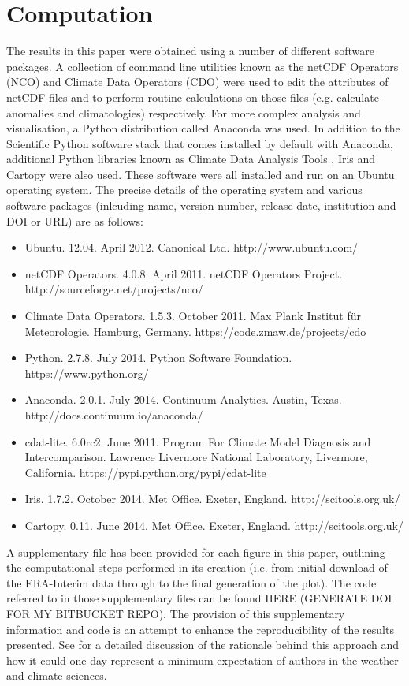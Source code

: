 \section{Computation}\label{s:computation}

The results in this paper were obtained using a number of different software packages. A collection of command line utilities known as the netCDF Operators (NCO) and Climate Data Operators (CDO) were used to edit the attributes of netCDF files and to perform routine calculations on those files (e.g. calculate anomalies and climatologies) respectively. For more complex analysis and visualisation, a Python distribution called Anaconda was used. In addition to the Scientific Python \citep[SciPy;][]{SciPy} software stack that comes installed by default with Anaconda, additional Python libraries known as Climate Data Analysis Tools \citep[CDAT;][]{Doutriaux2009}, Iris and Cartopy were also used. These software were all installed and run on an Ubuntu operating system. The precise details of the operating system and various software packages (inlcuding name, version number, release date, institution and DOI or URL) are as follows:
\begin{itemize}
\item Ubuntu. 12.04. April 2012. Canonical Ltd. http://www.ubuntu.com/
\item netCDF Operators. 4.0.8. April 2011. netCDF Operators Project. http://sourceforge.net/projects/nco/
\item Climate Data Operators. 1.5.3. October 2011. Max Plank Institut f{\"u}r Meteorologie. Hamburg, Germany. https://code.zmaw.de/projects/cdo
\item Python. 2.7.8. July 2014. Python Software Foundation. https://www.python.org/
\item Anaconda. 2.0.1. July 2014. Continuum Analytics. Austin, Texas. http://docs.continuum.io/anaconda/
\item cdat-lite. 6.0rc2. June 2011. Program For Climate Model Diagnosis and Intercomparison. Lawrence Livermore National Laboratory, Livermore, California. https://pypi.python.org/pypi/cdat-lite
\item Iris. 1.7.2. October 2014. Met Office. Exeter, England. http://scitools.org.uk/
\item Cartopy. 0.11. June 2014. Met Office. Exeter, England. http://scitools.org.uk/
\end{itemize}

A supplementary file has been provided for each figure in this paper, outlining the computational steps performed in its creation (i.e. from initial download of the ERA-Interim data through to the final generation of the plot). The code referred to in those supplementary files can be found HERE (GENERATE DOI FOR MY BITBUCKET REPO). The provision of this supplementary information and code is an attempt to enhance the reproducibility of the results presented. See \citet{Irving2015} for a detailed discussion of the rationale behind this approach and how it could one day represent a minimum expectation of authors in the weather and climate sciences. 